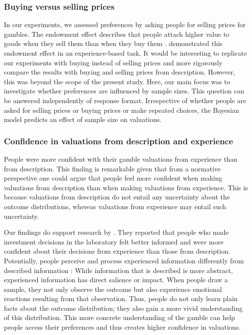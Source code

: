 \documentclass[a4paper, man, natbib, floatsintext]{apa6}
\begin{document}
\subsubsection{Buying versus selling prices}
In our experiments, we assessed preferences by asking people for selling prices for gambles. 
The endowment effect describes that people attach higher value to goods when they sell them than when they buy them \citep{Thaler1980}. \cite{Pachur2012} demonstrated this endowment effect in an experience-based task. It would be interesting to replicate our experiments with buying instead of selling prices and more rigorously compare the results with buying and selling prices from description. However, this was beyond the scope of the present study. Here, our main focus was to investigate whether preferences are influenced by sample sizes. This question can be answered independently of response format. Irrespective of whether people are asked for selling prices or buying prices or make repeated choices, the Bayesian model predicts an effect of sample size on valuations. 

\subsubsection{Confidence in valuations from description and experience}
People were more confident with their gamble valuations from experience than from description. This finding is remarkable given that from a normative perspective one could argue that people feel more confident when making valuations from description than when making valuations from experience. This is because valuations from description do not entail any uncertainty about the outcome distributions, whereas valuations from experience may entail such uncertainty.

Our findings do support research by \cite{Bradbury2014}. They reported that people who made investment decisions in the laboratory felt better informed and were more confident about their decisions from experience than those from description.
Potentially, people perceive and process experienced information differently from described information \citep{Kahneman2009}: 
While information that is described is more abstract, experienced information has direct salience or impact. When people draw a sample, they not only observe the outcome but also experience emotional reactions resulting from that observation. Thus, people do not only learn plain facts about the outcome distribution; they also gain a more vivid understanding of this distribution. This more concrete understanding of the gamble can help people access their preferences and thus creates higher confidence in valuations.









\end{document}
